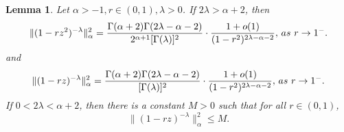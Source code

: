 \documentclass[10pt,a4paper]{amsart}
\newtheorem{lemma}{Lemma}
\begin{document}
\begin{lemma}\label{l-2}
Let $\alpha>-1, r\in (0,1), \lambda>0$. If $2\lambda>\alpha+2$, then  
\begin{equation}\label{a-e-1}
 \|{(1-rz^2)^{-\lambda}}\|_{\alpha}^2=\frac{\Gamma(\alpha+2)\Gamma(2\lambda-\alpha-2)}{2^{\alpha+1}[\Gamma(\lambda)]^2}\cdot\frac{1+{o}(1)}{(1-r^2)^{2\lambda-\alpha-2}},\, {\textup{as}}\,\, r\rightarrow 1^{-}. 
 \end{equation}
 and \begin{equation}\label{a-e-2}
   \|{(1-rz)^{-\lambda}}\|_{\alpha}^2=\frac{\Gamma(\alpha+2)\Gamma(2\lambda-\alpha-2)}{[\Gamma(\lambda)]^2}\cdot\frac{1+{o}(1)}{(1-r^2)^{2\lambda-\alpha-2}},\, {\textup{as}}\,\, r\rightarrow 1^{-}. 
 \end{equation} 
 If $0<2\lambda<\alpha+2$, then there is a constant $M>0$ such that for all $r\in (0,1)$,
 \begin{equation}\label{a-e-3}
   \|{(1-rz)^{-\lambda}}\|_{\alpha}^2\leq M.
 \end{equation}\end{lemma} 
\end{document}
